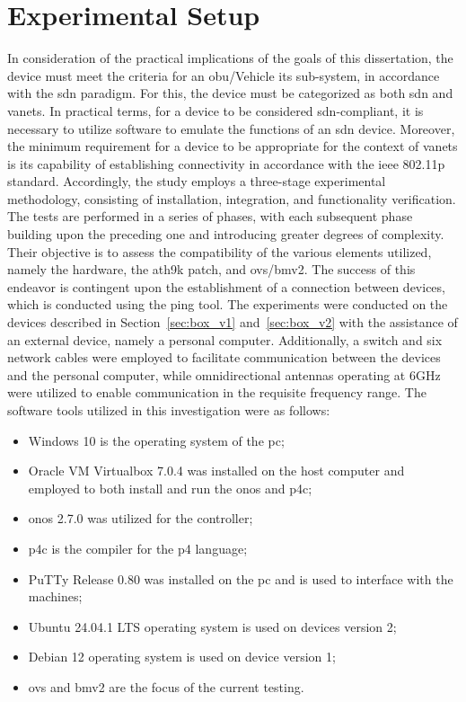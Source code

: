 \section{Experimental Setup}
In consideration of the practical implications of the goals of this dissertation, the device must meet the criteria for an \gls{obu}/Vehicle \gls{its} sub-system, in accordance with the \gls{sdn} paradigm. For this, the device must be categorized as both \gls{sdn} and \glspl{vanet}. In practical terms, for a device to be considered \gls{sdn}-compliant, it is necessary to utilize software to emulate the functions of an \gls{sdn} device. Moreover, the minimum requirement for a device to be appropriate for the context of \glspl{vanet} is its capability of establishing connectivity in accordance with the \gls{ieee} 802.11p standard.
Accordingly, the study employs a three-stage experimental methodology, consisting of installation, integration, and functionality verification. The tests are performed in a series of phases, with each subsequent phase building upon the preceding one and introducing greater degrees of complexity. Their objective is to assess the compatibility of the various elements utilized, namely the hardware, the ath9k patch, and \gls{ovs}/\gls{bmv2}. The success of this endeavor is contingent upon the establishment of a connection between devices, which is conducted using the ping tool.
The experiments were conducted on the devices described in Section~\ref{sec:box_v1} and~\ref{sec:box_v2} with the assistance of an external device, namely a personal computer. Additionally, a switch and six network cables were employed to facilitate communication between the devices and the personal computer, while omnidirectional antennas operating at 6GHz were utilized to enable communication in the requisite frequency range.
The software tools utilized in this investigation were as follows:
\begin{itemize}
	\item Windows 10 is the operating system of the \gls{pc};
	\item Oracle VM Virtualbox 7.0.4 was installed on the host computer and employed to both install and run the \gls{onos} and p4c;
	\item \gls{onos} 2.7.0 was utilized for the controller;
	\item p4c is the compiler for the \gls{p4} language;
	\item PuTTy Release 0.80 was installed on the \gls{pc} and is used to interface with the machines;
	\item Ubuntu 24.04.1 LTS operating system is used on devices version 2;
	\item Debian 12 operating system is used on device version 1;
	\item \gls{ovs} and \gls{bmv2} are the focus of the current testing.
\end{itemize}
